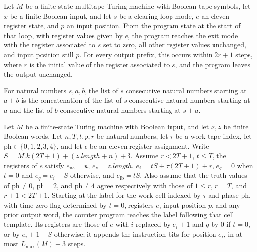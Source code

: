\begin{theorem}
\label{Complexity.UTab.goes_clearR}
\leanok
{}
Let $M$ be a finite-state multitape Turing machine with Boolean tape symbols, let $x$ be
a finite Boolean input, and let $s$ be a clearing-loop mode, $e$ an eleven-register
state, and $p$ an input position. From the program state at the start of that loop, with
register values given by $e$, the program reaches the exit mode with the register
associated to $s$ set to zero, all other register values unchanged, and input position
still $p$. For every output prefix, this occurs within $2r+1$ steps, where $r$ is the
initial value of the register associated to $s$, and the program leaves the output
unchanged.
\end{theorem}

\begin{theorem}
\label{Complexity.UTab.range'_add}
\leanok
{}
For natural numbers $s,a,b$, the list of $s$ consecutive natural numbers starting at
$a+b$ is the concatenation of the list of $s$ consecutive natural numbers starting at
$a$ and the list of $b$ consecutive natural numbers starting at $s+a$.
\end{theorem}

\begin{theorem}
\label{Complexity.UTab.goes_cell_one}
\leanok
{}
Let $M$ be a finite-state Turing machine with Boolean input, and let $x,z$ be finite
Boolean words. Let $n,T,t,p,r$ be natural numbers, let $\tau$ be a work-tape index, let
$\mathrm{ph}\in\{0,1,2,3,4\}$, and let $e$ be an eleven-register assignment. Write
$S=M.k(2T+1)+(z.length+n)+3$. Assume $r<2T+1$, $t\le T$, the registers of $e$ satisfy
$e_{\mathrm{nc}}=n$, $e_z=z.length$, $e_i=tS+\tau(2T+1)+r$, $e_q=0$ when $t=0$ and
$e_q=e_i-S$ otherwise, and $e_{\mathrm{lb}}=tS$. Also assume that the truth values of
$\mathrm{ph}\ne0$, $\mathrm{ph}=2$, and $\mathrm{ph}\ne4$ agree respectively with those
of $1\le r$, $r=T$, and $r+1<2T+1$. Starting at the label for the work cell indexed by
$\tau$ and phase $\mathrm{ph}$, with time-zero flag determined by $t=0$, registers $e$,
input position $p$, and any prior output word, the counter program reaches the label
following that cell template. Its registers are those of $e$ with $i$ replaced by
$e_i+1$ and $q$ by $0$ if $t=0$, or by $e_i+1-S$ otherwise; it appends the instruction
bits for position $e_i$, in at most $L_{\max}(M)+3$ steps.
\end{theorem}

